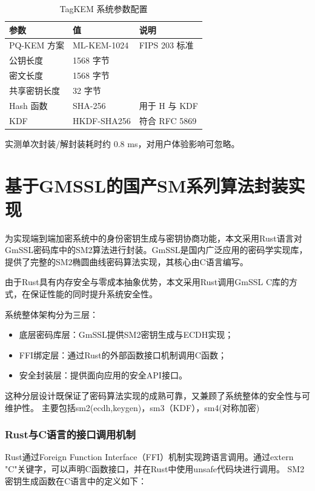 \begin{table}[htbp]
\centering
\caption{TagKEM 系统参数配置}
\begin{tabular}{lll}
\toprule
参数 & 值 & 说明 \\
\midrule
PQ-KEM 方案 & ML-KEM-1024 & FIPS 203 标准 \\
公钥长度 & 1568 字节 & \\
密文长度 & 1568 字节 & \\
共享密钥长度 & 32 字节 & \\
Hash 函数 & SHA-256 & 用于 H 与 KDF \\
KDF & HKDF-SHA256 & 符合 RFC 5869 \\
\bottomrule
\end{tabular}
\end{table}

实测单次封装/解封装耗时约 0.8 ms，对用户体验影响可忽略。


\section{基于GMSSL的国产SM系列算法封装实现}
为实现端到端加密系统中的身份密钥生成与密钥协商功能，本文采用Rust语言对GmSSL密码库中的SM2算法进行封装。GmSSL是国内广泛应用的密码学实现库，提供了完整的SM2椭圆曲线密码算法实现，其核心由C语言编写。

由于Rust具有内存安全与零成本抽象优势，本文采用Rust调用GmSSL C库的方式，在保证性能的同时提升系统安全性。

系统整体架构分为三层：

\begin{itemize}
\item 底层密码库层：GmSSL提供SM2密钥生成与ECDH实现；
\item FFI绑定层：通过Rust的外部函数接口机制调用C函数；
\item 安全封装层：提供面向应用的安全API接口。
\end{itemize}

这种分层设计既保证了密码算法实现的成熟可靠，又兼顾了系统整体的安全性与可维护性。
主要包括sm2(ecdh,keygen)，sm3（KDF），sm4(对称加密)

\subsubsection{Rust与C语言的接口调用机制}
Rust通过Foreign Function Interface（FFI）机制实现跨语言调用。通过extern "C"关键字，可以声明C函数接口，并在Rust中使用unsafe代码块进行调用。
SM2密钥生成函数在C语言中的定义如下：

